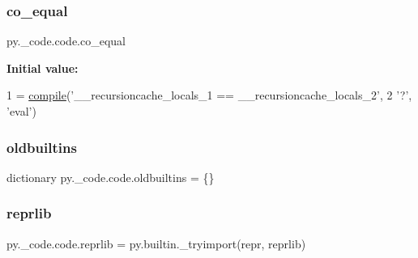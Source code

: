 \mbox{\label{namespacepy_1_1__code_1_1code_ac976a81ad3d6cdd1f763d01c3b0b8fac}} 
\subsubsection{\texorpdfstring{co\+\_\+equal}{co\_equal}}
{\footnotesize\ttfamily py.\+\_\+code.\+code.\+co\+\_\+equal}

{\bfseries Initial value\+:}
\begin{DoxyCode}
1 =  \hyperlink{namespacepygame_1_1cursors_a19f38a01d13e77f591209869d99d99e5}{compile}(\textcolor{stringliteral}{'\_\_recursioncache\_locals\_1 == \_\_recursioncache\_locals\_2'},
2                    \textcolor{stringliteral}{'?'}, \textcolor{stringliteral}{'eval'})
\end{DoxyCode}
\mbox{\label{namespacepy_1_1__code_1_1code_a7b0c58e407c3259902dd6ab9b9940514}} 
\subsubsection{\texorpdfstring{oldbuiltins}{oldbuiltins}}
{\footnotesize\ttfamily dictionary py.\+\_\+code.\+code.\+oldbuiltins = \{\}}

\mbox{\label{namespacepy_1_1__code_1_1code_a380bb8eed21da20c4e4104a05947e230}} 
\subsubsection{\texorpdfstring{reprlib}{reprlib}}
{\footnotesize\ttfamily py.\+\_\+code.\+code.\+reprlib = py.\+builtin.\+\_\+tryimport(\textquotesingle{}repr\textquotesingle{}, \textquotesingle{}reprlib\textquotesingle{})}

